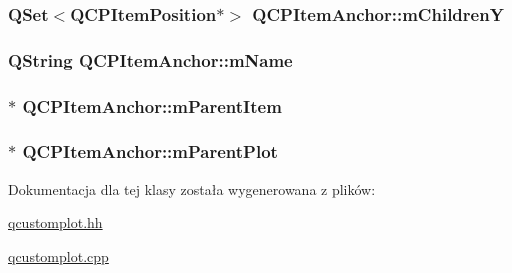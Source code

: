 \subsubsection[{\texorpdfstring{m\+ChildrenY}{mChildrenY}}]{\setlength{\rightskip}{0pt plus 5cm}Q\+Set$<${\bf Q\+C\+P\+Item\+Position}$\ast$$>$ Q\+C\+P\+Item\+Anchor\+::m\+ChildrenY\hspace{0.3cm}{\ttfamily [protected]}}\hypertarget{class_q_c_p_item_anchor_a3abe4eebd0683454d81c8341df6f7115}{}\label{class_q_c_p_item_anchor_a3abe4eebd0683454d81c8341df6f7115}
\subsubsection[{\texorpdfstring{m\+Name}{mName}}]{\setlength{\rightskip}{0pt plus 5cm}Q\+String Q\+C\+P\+Item\+Anchor\+::m\+Name\hspace{0.3cm}{\ttfamily [protected]}}\hypertarget{class_q_c_p_item_anchor_a23ad4d0ab0d2cbb41a7baf05bcf996ec}{}\label{class_q_c_p_item_anchor_a23ad4d0ab0d2cbb41a7baf05bcf996ec}
\subsubsection[{\texorpdfstring{m\+Parent\+Item}{mParentItem}}]{$\ast$ Q\+C\+P\+Item\+Anchor\+::m\+Parent\+Item\hspace{0.3cm}{\ttfamily [protected]}}\hypertarget{class_q_c_p_item_anchor_a80fad480ad3bb980446ed6ebc00818ae}{}\label{class_q_c_p_item_anchor_a80fad480ad3bb980446ed6ebc00818ae}
\subsubsection[{\texorpdfstring{m\+Parent\+Plot}{mParentPlot}}]{$\ast$ Q\+C\+P\+Item\+Anchor\+::m\+Parent\+Plot\hspace{0.3cm}{\ttfamily [protected]}}\hypertarget{class_q_c_p_item_anchor_a59b968410831ba91a25cc75a77dde6f5}{}\label{class_q_c_p_item_anchor_a59b968410831ba91a25cc75a77dde6f5}


Dokumentacja dla tej klasy została wygenerowana z plików\+:\begin{DoxyCompactItemize}
\item 
\hyperlink{qcustomplot_8hh}{qcustomplot.\+hh}\item 
\hyperlink{qcustomplot_8cpp}{qcustomplot.\+cpp}\end{DoxyCompactItemize}
